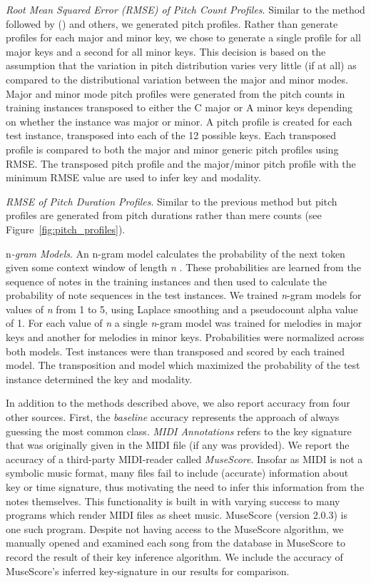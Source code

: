 \documentclass[letterpaper]{article}
\begin{document}
\emph{Root Mean Squared Error (RMSE) of Pitch Count Profiles}. Similar to the method followed by \citeauthor{krumhansl2001cognitive} (\citeyear{krumhansl2001cognitive}) and others, we generated pitch profiles. Rather than generate profiles for each major and minor key, we chose to generate a single profile for all major keys and a second for all minor keys. This decision is based on the assumption that the variation in pitch distribution varies very little (if at all) as compared to the distributional variation between the major and minor modes. Major and minor mode pitch profiles were generated from the pitch counts in training instances transposed to either the C major or A minor keys depending on whether the instance was major or minor. A pitch profile is created for each test instance, transposed into each of the 12 possible keys. Each transposed profile is compared to both the major and minor generic pitch profiles using RMSE. The transposed pitch profile and the major/minor pitch profile with the minimum RMSE value are used to infer key and modality.

\emph{RMSE of Pitch Duration Profiles}. Similar to the previous method but pitch profiles are generated from pitch durations rather than mere counts (see Figure~\ref{fig:pitch_profiles}). 

n\emph{-gram Models}. An n-gram model calculates the probability of the next token given some context window of length \emph{n} \cite{brown1992class}. These probabilities are learned from the sequence of notes in the training instances and then used to calculate the probability of note sequences in the test instances. We trained \emph{n}-gram models for values of \emph{n} from 1 to 5, using Laplace smoothing and a pseudocount alpha value of 1. For each value of \emph{n} a single \emph{n}-gram model was trained for melodies in major keys and another for melodies in minor keys. Probabilities were normalized across both models. Test instances were than transposed and scored by each trained model. The transposition and model which maximized the probability of the test instance determined the key and modality.

In addition to the methods described above, we also report accuracy from four other sources. First, the \emph{baseline} accuracy represents the approach of always guessing the most common class. \emph{MIDI Annotations} refers to the key signature that was originally given in the MIDI file (if any was provided). We report the accuracy of a third-party MIDI-reader called \emph{MuseScore}. Insofar as MIDI is not a symbolic music format, many files fail to include (accurate) information about key or time signature, thus motivating the need to infer this information from the notes themselves. This functionality is built in with varying success to many programs which render MIDI files as sheet music. MuseScore (version 2.0.3) is one such program. Despite not having access to the MuseScore algorithm, we manually opened and examined each song from the database in MuseScore to record the result of their key inference algorithm. We include the accuracy of MuseScore's inferred key-signature in our results for comparison.
\end{document}
